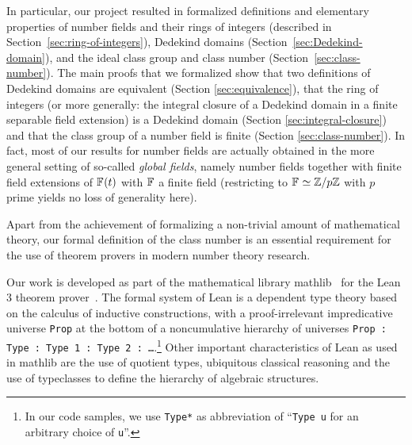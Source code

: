 \documentclass[a4paper,USenglish,cleveref, autoref, thm-restate]{lipics-v2021}
\newcommand{\lean}[1]{\texttt{#1}\xspace} %
\newcommand*{\Fq}[1][q]{\mathbb{F}_{#1}}
\newcommand{\mathlib}{\textsf{mathlib}\xspace}
\newcommand{\Z}{\mathbb{Z}}
\begin{document}
In particular, our project resulted in formalized definitions and elementary properties of
number fields and their rings of integers (described in Section~\ref{sec:ring-of-integers}),
Dedekind domains (Section~\ref{sec:Dedekind-domain}),
and the ideal class group and class number (Section~\ref{sec:class-number}).
The main proofs that we formalized show
that two definitions of Dedekind domains are equivalent (Section \ref{sec:equivalence}),
that the ring of integers (or more generally: the integral closure of a Dedekind domain in a finite separable field extension) is a Dedekind domain (Section \ref{sec:integral-closure})
and that the class group of a number field is finite (Section \ref{sec:class-number}).
In fact, most of our results for number fields are actually obtained in the more general setting of so-called \emph{global fields},
namely number fields together with finite field extensions of $\Fq[\empty](t)$ with $\Fq[\empty]$ a finite field (restricting to $\Fq[\empty]\simeq \Z/p\Z$ with $p$ prime yields no loss of generality here).

%
%
%

Apart from the achievement of formalizing a non-trivial amount of mathematical theory,
our formal definition of the class number is an essential requirement
for the use of theorem provers in modern number theory research.

Our work is developed as part of the mathematical library \mathlib~\cite{mathlib} for the Lean 3 theorem prover~\cite{lean-prover}.
The formal system of Lean is a dependent type theory based on the calculus of inductive constructions,
with a proof-irrelevant impredicative universe \lean{Prop} at the bottom of a noncumulative hierarchy of universes \lean{Prop : Type : Type 1 : Type 2 : \dots}.\footnote{In our code samples, we use \lean{Type*} as abbreviation of ``\lean{Type u} for an arbitrary choice of \lean{u}''.}
Other important characteristics of Lean as used in \mathlib are the use of quotient types, ubiquitous classical reasoning and the use of typeclasses to define the hierarchy of algebraic structures.
\end{document}
